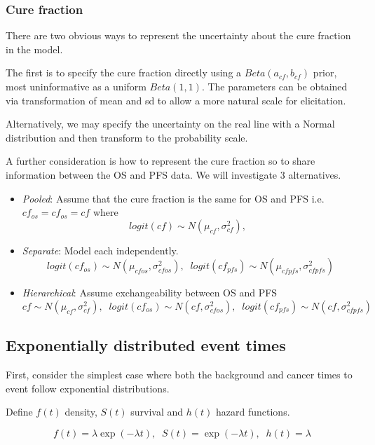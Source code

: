 \documentclass[
]{article}
\providecommand{\tightlist}{%
  \setlength{\itemsep}{0pt}\setlength{\parskip}{0pt}}
\begin{document}
\hypertarget{cure-fraction}{%
\subsubsection{Cure fraction}\label{cure-fraction}}

There are two obvious ways to represent the uncertainty about the cure
fraction in the model.

The first is to specify the cure fraction directly using a
\(Beta(a_{cf}, b_{cf})\) prior, most uninformative as a uniform
\(Beta(1,1)\). The parameters can be obtained via transformation of mean
and sd to allow a more natural scale for elicitation.

Alternatively, we may specify the uncertainty on the real line with a
Normal distribution and then transform to the probability scale.

A further consideration is how to represent the cure fraction so to
share information between the OS and PFS data. We will investigate 3
alternatives.

\begin{itemize}
\tightlist
\item
  \emph{Pooled}: Assume that the cure fraction is the same for OS and
  PFS i.e.~\(cf_{os} = cf_{os} = cf\) where \[
  logit(cf) \sim N(\mu_{cf}, \sigma_{cf}^2), \;\;
  \]
\item
  \emph{Separate}: Model each independently. \[
  logit(cf_{os}) \sim N(\mu_{cfos}, \sigma_{cfos}^2), \;\;  
  logit(cf_{pfs}) \sim N(\mu_{cfpfs}, \sigma_{cfpfs}^2)  
  \]
\item
  \emph{Hierarchical}: Assume exchangeability between OS and PFS\[
  cf \sim N(\mu_{cf}, \sigma_{cf}^2), \;\;  
  logit(cf_{os}) \sim N(cf, \sigma_{cfos}^2), \;\;  
  logit(cf_{pfs}) \sim N(cf, \sigma_{cfpfs}^2)  
  \]
\end{itemize}

\hypertarget{exponentially-distributed-event-times}{%
\subsection{Exponentially distributed event
times}\label{exponentially-distributed-event-times}}

First, consider the simplest case where both the background and cancer
times to event follow exponential distributions.

Define \(f(t)\) density, \(S(t)\) survival and \(h(t)\) hazard
functions.

\[
f(t) = \lambda \exp(-\lambda t), \;\; S(t) = \exp(-\lambda t), \;\; h(t) = \lambda
\]
\end{document}
